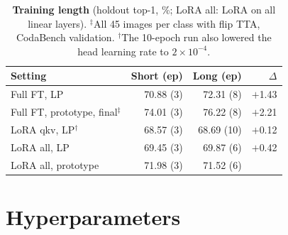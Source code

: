 \begin{table}[t]
  \centering
  \footnotesize
  \setlength{\tabcolsep}{3.5pt}
  \begin{tabular}{@{}lrrr@{}}
    \toprule
    Setting & Short (ep) & Long (ep) & $\Delta$ \\
    \midrule
    Full FT, LP & 70.88 (3) & 72.31 (8) & $+$1.43 \\
    Full FT, prototype, final$^\ddagger$ & 74.01 (3) & 76.22 (8) & $+$2.21 \\
    LoRA qkv, LP$^\dagger$ & 68.57 (3) & 68.69 (10) & $+$0.12 \\
    LoRA all, LP & 69.45 (3) & 69.87 (6) & $+$0.42 \\
    LoRA all, prototype & 71.98 (3) & 71.52 (6) & \minus0.46 \\
    \bottomrule
  \end{tabular}
  \caption{\textbf{Training length} (holdout top-1, \%; LoRA all: LoRA on all linear layers).
  $^\ddagger$All 45 images per class with flip TTA, CodaBench validation.
  $^\dagger$The 10-epoch run also lowered the head learning rate to $2{\times}10^{-4}$.}
  \label{tab:length}
\end{table}

\section{Hyperparameters}
\label{sec:hparams}


